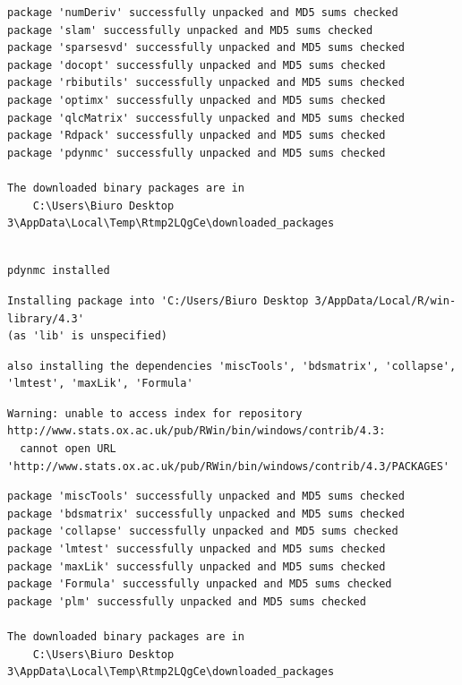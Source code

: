 \documentclass[
  11pt,
]{article}
\begin{document}
\begin{verbatim}
package 'numDeriv' successfully unpacked and MD5 sums checked
package 'slam' successfully unpacked and MD5 sums checked
package 'sparsesvd' successfully unpacked and MD5 sums checked
package 'docopt' successfully unpacked and MD5 sums checked
package 'rbibutils' successfully unpacked and MD5 sums checked
package 'optimx' successfully unpacked and MD5 sums checked
package 'qlcMatrix' successfully unpacked and MD5 sums checked
package 'Rdpack' successfully unpacked and MD5 sums checked
package 'pdynmc' successfully unpacked and MD5 sums checked

The downloaded binary packages are in
    C:\Users\Biuro Desktop 3\AppData\Local\Temp\Rtmp2LQgCe\downloaded_packages
\end{verbatim}

\begin{verbatim}

pdynmc installed
\end{verbatim}

\begin{verbatim}
Installing package into 'C:/Users/Biuro Desktop 3/AppData/Local/R/win-library/4.3'
(as 'lib' is unspecified)
\end{verbatim}

\begin{verbatim}
also installing the dependencies 'miscTools', 'bdsmatrix', 'collapse', 'lmtest', 'maxLik', 'Formula'
\end{verbatim}

\begin{verbatim}
Warning: unable to access index for repository http://www.stats.ox.ac.uk/pub/RWin/bin/windows/contrib/4.3:
  cannot open URL 'http://www.stats.ox.ac.uk/pub/RWin/bin/windows/contrib/4.3/PACKAGES'
\end{verbatim}

\begin{verbatim}
package 'miscTools' successfully unpacked and MD5 sums checked
package 'bdsmatrix' successfully unpacked and MD5 sums checked
package 'collapse' successfully unpacked and MD5 sums checked
package 'lmtest' successfully unpacked and MD5 sums checked
package 'maxLik' successfully unpacked and MD5 sums checked
package 'Formula' successfully unpacked and MD5 sums checked
package 'plm' successfully unpacked and MD5 sums checked

The downloaded binary packages are in
    C:\Users\Biuro Desktop 3\AppData\Local\Temp\Rtmp2LQgCe\downloaded_packages
\end{verbatim}
\end{document}
